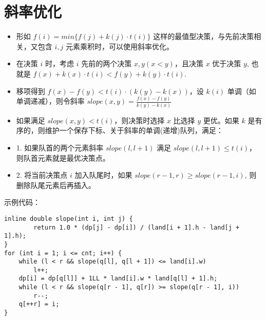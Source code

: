 \section{斜率优化}

\begin{itemize}
\item 形如 $f(i) = min\{f(j) + k(j) \cdot t(i)\}$ 这样的最值型决策，与先前决策相关，又包含 $i,j$ 元素乘积时，可以使用斜率优化。
\item 在决策 $i$ 时，考虑 $i$ 先前的两个决策 $x, y (x < y)$，且决策 $x$ 优于决策 $y$, 也就是 $f(x)+k(x) \cdot t(i) < f(y) + k(y)\cdot t(i)$.
\item 移项得到 $f(x)-f(y) < t(i) \cdot (k(y)-k(x))$，设 $k(i)$ 单调（如单调递减），则令斜率 $slope(x, y) = \frac{f(x)-f(y)}{k(y)-k(x)}$
\item 如果满足 $slope(x, y) < t(i)$，则决策时选择 $x$ 比选择 $y$ 更优。如果 $k$ 是有序的，则维护一个保存下标、关于斜率的单调(递增)队列，满足：
\item 1. 如果队首的两个元素斜率 $slope(l, l+1)$ 满足 $slope(l, l+1) \leq t(i)$，则队首元素就是最优决策点。
\item 2. 将当前决策点 $i$ 加入队尾时，如果 $slope(r-1, r) \geq slope(r-1, i)$, 则删除队尾元素后再插入。
\end{itemize}

\noindent \par 示例代码：
\begin{verbatim}
inline double slope(int i, int j) {
        return 1.0 * (dp[j] - dp[i]) / (land[i + 1].h - land[j + 1].h);
}
for (int i = 1; i <= cnt; i++) {
    while (l < r && slope(q[l], q[l + 1]) <= land[i].w)
        l++;
    dp[i] = dp[q[l]] + 1LL * land[i].w * land[q[l] + 1].h;
    while (l < r && slope(q[r - 1], q[r]) >= slope(q[r - 1], i))
        r--;
    q[++r] = i;
}
\end{verbatim}